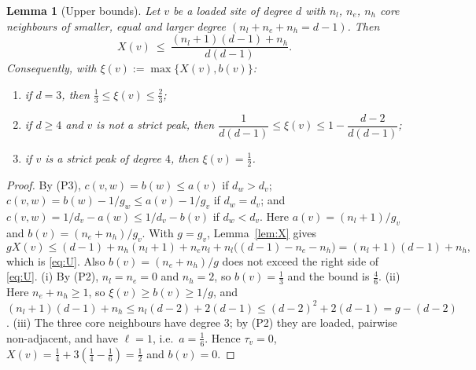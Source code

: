 \documentclass[11pt,a4paper]{article}
\newtheorem{lemma}[theorem]{Lemma}
\theoremstyle{definition}
\theoremstyle{remark}
\numberwithin{equation}{section}
\begin{document}
\begin{lemma}[Upper bounds]\label{lem:upper}
Let $v$ be a loaded site of degree $d$ with $n_l$, $n_e$, $n_h$ core neighbours
of smaller, equal and larger degree $(n_l+n_e+n_h=d-1)$. Then
\begin{equation}\label{eq:U}
 X(v)\ \le\ \frac{(n_l+1)(d-1)+n_h}{d(d-1)} .
\end{equation}
Consequently, with $\xi(v):=\max\{X(v),b(v)\}$:
\begin{enumerate}[label=(\roman*)]
\item if $d=3$, then $\frac13\le\xi(v)\le\frac23$;
\item if $d\ge4$ and $v$ is not a strict peak, then
$\dfrac1{d(d-1)}\le\xi(v)\le1-\dfrac{d-2}{d(d-1)}$;
\item if $v$ is a strict peak of degree $4$, then $\xi(v)=\frac12$.
\end{enumerate}
\end{lemma}
\begin{proof}
By (P3), $c(v,w)=b(w)\le a(v)$ if $d_w>d_v$; $c(v,w)=b(w)-1/g_w\le a(v)-1/g_v$ if
$d_w=d_v$; and $c(v,w)=1/d_v-a(w)\le1/d_v-b(v)$ if $d_w<d_v$. Here
$a(v)=(n_l+1)/g_v$ and $b(v)=(n_e+n_h)/g_v$. With $g=g_v$, Lemma~\ref{lem:X} gives
\[
 gX(v)\le(d-1)+n_h(n_l+1)+n_e n_l+n_l\bigl((d-1)-n_e-n_h\bigr)
 =(n_l+1)(d-1)+n_h ,
\]
which is \eqref{eq:U}. Also $b(v)=(n_e+n_h)/g$ does not exceed the right side of
\eqref{eq:U}. (i) By (P2), $n_l=n_e=0$ and $n_h=2$, so $b(v)=\frac13$ and the bound
is $\frac46$. (ii) Here $n_e+n_h\ge1$, so $\xi(v)\ge b(v)\ge1/g$, and
$(n_l+1)(d-1)+n_h\le n_l(d-2)+2(d-1)\le(d-2)^2+2(d-1)=g-(d-2)$. (iii) The three
core neighbours have degree $3$; by (P2) they are loaded, pairwise non-adjacent,
and have $\ell=1$, i.e.\ $a=\frac16$. Hence $\tau_v=0$,
$X(v)=\frac14+3(\frac14-\frac16)=\frac12$ and $b(v)=0$.
\end{proof}
\end{document}
